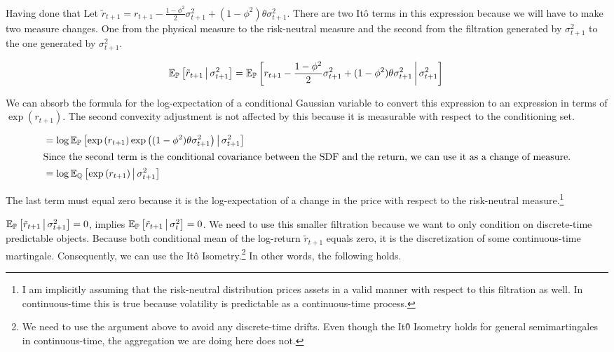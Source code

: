 \documentclass[11pt, letterpaper, twoside, final]{article}
\begin{document}
Having done that 
Let $\tilde{r}_{t+1} = r_{t+1} - \frac{1 - \phi^2}{2} \sigma^2_{t+1} + (1 - \phi^2) \theta \sigma^2_{t+1}$.
There are two It\^{o} terms in this expression because we will have to make two measure changes.
One from the physical measure to the risk-neutral measure and the second from the filtration generated by
$\sigma^2_{t+1}$ to the one generated by $\sigma^2_{t+1}$.


\begin{equation}
    \operatorname{\mathbb{E}}_{\mathbb{P}}\left[\tilde{r}_{t+1} \,\middle\vert\, \sigma^2_{t+1} \right]  
    = \operatorname{\mathbb{E}}_{\mathbb{P}}\left[r_{t+1} - \frac{1 - \phi^2}{2} \sigma^2_{t+1} + (1 - \phi^2) \theta \sigma^2_{t+1} \,\middle\vert\,
        \sigma^2_{t+1} \right]  \\
\end{equation}

We can absorb the formula for the log-expectation of a conditional Gaussian variable to convert this expression to
an expression in terms of $\exp(r_{t+1})$. 
The second convexity adjustment is not affected by this because it is measurable with respect to the conditioning
set.

\begin{align}
    &= \log \E_{\PP}\left[\exp\left(r_{t+1}\right) \exp\left((1 - \phi^2) \theta \sigma^2_{t+1}\right) \mvert
       \sigma^2_{t+1} \right]\\
%
    \intertext{Since the second term is the conditional covariance between the SDF and the return, we can use it
    as a change of measure.}
%
    &= \log \E_{\QQ}\left[\exp\left(r_{t+1}\right) \mvert \sigma^2_{t+1} \right]
\end{align}

The last term must equal zero because it is the log-expectation of a change in the price with respect to the
risk-neutral measure.\footnote{I am implicitly assuming that the risk-neutral distribution prices assets in a
    valid manner with respect to this filtration as well. In continuous-time this is true because volatility is
predictable as a continuous-time process.} 

$\operatorname{\mathbb{E}}_{\mathbb{P}}\left[\tilde{r}_{t+1} \,\middle\vert\, \sigma^2_{t+1} \right] = 0$, implies $\operatorname{\mathbb{E}}_{\mathbb{P}}\left[\tilde{r}_{t+1}
\,\middle\vert\, \sigma^2_{t} \right] = 0$.
We need to use this smaller filtration because we want to only condition on discrete-time predictable objects.
Because both conditional mean of the log-return $\tilde{r}_{t+1}$ equals zero, it is the discretization of some
continuous-time martingale. 
Consequently, we can use the It\^{o} Isometry.\footnote{We need to use the argument above to avoid any
    discrete-time drifts. Even though the It\^{0} Isometry holds for general semimartingales in continuous-time,
the aggregation we are doing here does not.} 
In other words, the following holds. 
\end{document}
